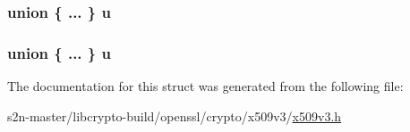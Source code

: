 \subsubsection[{\texorpdfstring{u}{u}}]{\setlength{\rightskip}{0pt plus 5cm}union \{ ... \}   u}\hypertarget{struct_i_p_address_or_range__st_a70b7a72c9dce982667dbbf113b54e63a}{}\label{struct_i_p_address_or_range__st_a70b7a72c9dce982667dbbf113b54e63a}
\subsubsection[{\texorpdfstring{u}{u}}]{\setlength{\rightskip}{0pt plus 5cm}union \{ ... \}   u}\hypertarget{struct_i_p_address_or_range__st_a33b3008ea240f0619d17a5bd68957f90}{}\label{struct_i_p_address_or_range__st_a33b3008ea240f0619d17a5bd68957f90}


The documentation for this struct was generated from the following file\+:\begin{DoxyCompactItemize}
\item 
s2n-\/master/libcrypto-\/build/openssl/crypto/x509v3/\hyperlink{crypto_2x509v3_2x509v3_8h}{x509v3.\+h}\end{DoxyCompactItemize}
